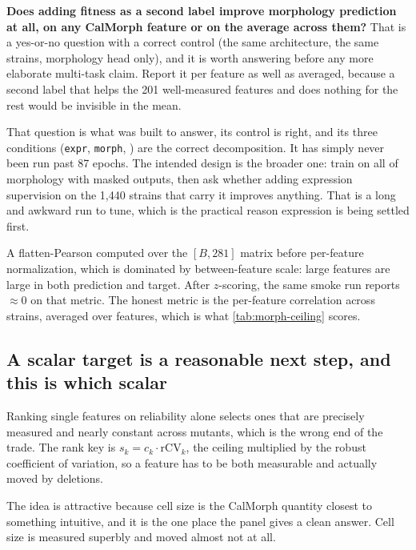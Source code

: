  \textbf{Does adding fitness as a second
label improve morphology prediction at all, on any CalMorph feature or on the average across
them?} That is a yes-or-no question with a correct control (the same architecture, the same
strains, morphology head only), and it is worth answering before any more elaborate
multi-task claim. Report it per feature as well as averaged, because a second label that
helps the 201 well-measured features and does nothing for the rest would be invisible in the
mean.

 That question is
what  was built to answer, its control is right, and
its three conditions (\texttt{expr}, \texttt{morph}, ) are the correct
decomposition. It has simply never been run past 87 epochs. The intended design is the
broader one: train on all of morphology with masked outputs, then ask whether adding
expression supervision on the 1,440 strains that carry it improves anything. That is a long
and awkward run to tune, which is the practical reason expression is being settled first.

 A flatten-Pearson computed over the
$[B, 281]$ matrix before per-feature normalization, which is dominated by between-feature
scale: large features are large in both prediction and target. After $z$-scoring, the same
smoke run reports $\approx 0$ on that metric. The honest metric is the per-feature
correlation across strains, averaged over features, which is what
\cref{tab:morph-ceiling} scores.

\subsection{A scalar target is a reasonable next step, and this is which scalar}

Ranking single features on reliability alone selects ones that are precisely measured and
nearly constant across mutants, which is the wrong end of the trade. The rank key is
$s_k = c_k \cdot \mathrm{rCV}_k$, the ceiling multiplied by the robust coefficient of
variation, so a feature has to be both measurable and actually moved by deletions.



 The idea is
attractive because cell size is the CalMorph quantity closest to something intuitive, and it
is the one place the panel gives a clean answer. Cell size is measured superbly and moved
almost not at all.


